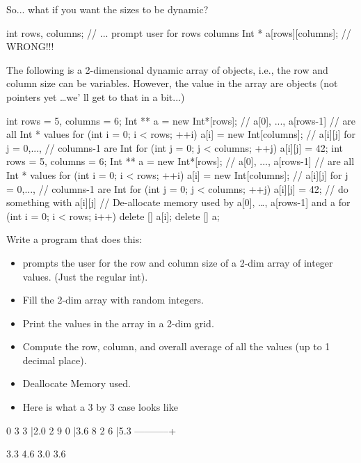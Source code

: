 So... what if you want the sizes to be dynamic?
\begin{console}
int rows, columns;
// ... prompt user for rows columns
Int * a[rows][columns]; // WRONG!!!
\end{console}
The following is a 2-dimensional dynamic array of objects, i.e., the row
and column size can be variables. However, the value in the array are
objects (not pointers yet \ldots we' ll get to that in
a bit...)
\begin{console}
int rows = 5, columns = 6;
Int ** a = new Int*[rows]; // a[0], ..., a[rows-1]
                           // are all Int * values
for (int i = 0; i < rows; ++i)
{   
    a[i] = new Int[columns]; // a[i][j] for j = 0,...,
                             // columns-1 are Int
    for (int j = 0; j < columns; ++j)
        a[i][j] = 42;
}
int rows = 5, columns = 6;
Int ** a = new Int*[rows]; // a[0], ..., a[rows-1]
                           // are all Int * values
for (int i = 0; i < rows; ++i)
{   
    a[i] = new Int[columns]; // a[i][j] for j = 0,...,
                             // columns-1 are Int
    for (int j = 0; j < columns; ++j)
        a[i][j] = 42;
}
// do something with a[i][j]
// De-allocate memory used by a[0], \ldots, a[rows-1] and a
for (int i = 0; i < rows; i++)
    delete [] a[i];
delete [] a;
\end{console}
\begin{ex}
Write a program that does this:
\begin{itemize}
\item
  prompts the user for the row and column size of a 2-dim array of
  integer values. (Just the regular int).
\item
  Fill the 2-dim array with random integers.
\item
  Print the values in the array in a 2-dim grid.
\item
  Compute the row, column, and overall average of all the values (up to
  1 decimal place).
\item
  Deallocate Memory used.
\item
  Here is what a 3 by 3 case looks like
\end{itemize}

\begin{console}
0    3   3 |2.0
2    9   0 |3.6
8    2   6 |5.3
-----------+

3.3 4.6 3.0 3.6
\end{console}
\end{ex}

